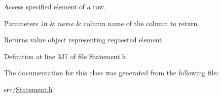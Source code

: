 Access specified element of a row. 


\begin{DoxyParams}[1]{Parameters}
\mbox{\tt in}  & {\em name} & column name of the column to return \\
\hline
\end{DoxyParams}
\begin{DoxyReturn}{Returns}
value object representing requested element 
\end{DoxyReturn}


Definition at line 337 of file Statement.\-h.



The documentation for this class was generated from the following file\-:\begin{DoxyCompactItemize}
\item 
src/\hyperlink{a00032}{Statement.\-h}\end{DoxyCompactItemize}
